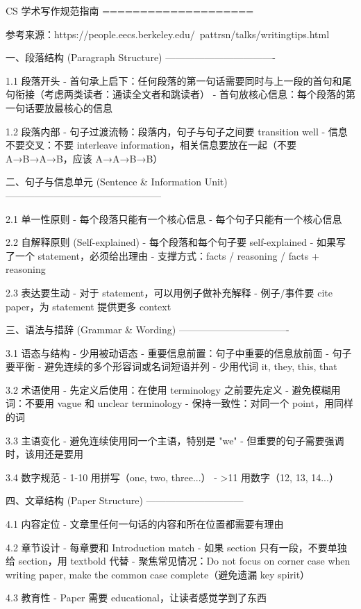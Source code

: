 CS 学术写作规范指南
====================

参考来源：https://people.eecs.berkeley.edu/~pattrsn/talks/writingtips.html


一、段落结构 (Paragraph Structure)
----------------------------------

1.1 段落开头
- 首句承上启下：任何段落的第一句话需要同时与上一段的首句和尾句衔接（考虑两类读者：通读全文者和跳读者）
- 首句放核心信息：每个段落的第一句话要放最核心的信息

1.2 段落内部
- 句子过渡流畅：段落内，句子与句子之间要 transition well
- 信息不要交叉：不要 interleave information，相关信息要放在一起（不要 A→B→A→B，应该 A→A→B→B）


二、句子与信息单元 (Sentence & Information Unit)
------------------------------------------------

2.1 单一性原则
- 每个段落只能有一个核心信息
- 每个句子只能有一个核心信息

2.2 自解释原则 (Self-explained)
- 每个段落和每个句子要 self-explained
- 如果写了一个 statement，必须给出理由
- 支撑方式：facts / reasoning / facts + reasoning

2.3 表达要生动
- 对于 statement，可以用例子做补充解释
- 例子/事件要 cite paper，为 statement 提供更多 context


三、语法与措辞 (Grammar & Wording)
----------------------------------

3.1 语态与结构
- 少用被动语态
- 重要信息前置：句子中重要的信息放前面
- 句子要平衡
- 避免连续的多个形容词或名词短语并列
- 少用代词 it, they, this, that

3.2 术语使用
- 先定义后使用：在使用 terminology 之前要先定义
- 避免模糊用词：不要用 vague 和 unclear terminology
- 保持一致性：对同一个 point，用同样的词

3.3 主语变化
- 避免连续使用同一个主语，特别是 "we"
- 但重要的句子需要强调时，该用还是要用

3.4 数字规范
- 1-10 用拼写（one, two, three...）
- >11 用数字（12, 13, 14...）


四、文章结构 (Paper Structure)
------------------------------

4.1 内容定位
- 文章里任何一句话的内容和所在位置都需要有理由

4.2 章节设计
- 每章要和 Introduction match
- 如果 section 只有一段，不要单独给 section，用 textbold 代替
- 聚焦常见情况：Do not focus on corner case when writing paper, make the common case complete（避免遗漏 key spirit）

4.3 教育性
- Paper 需要 educational，让读者感觉学到了东西


